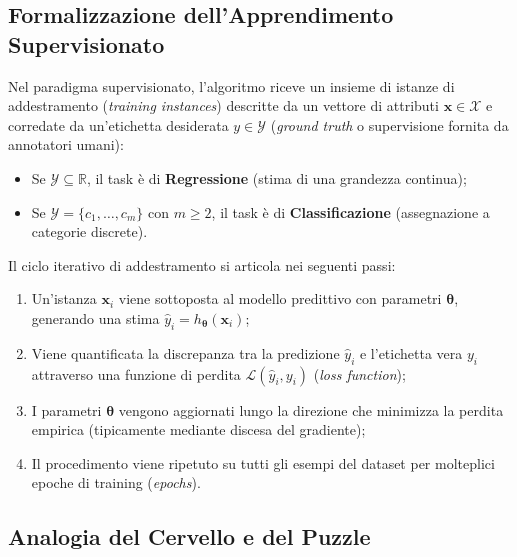 \FloatBarrier
\subsection{Formalizzazione dell'Apprendimento Supervisionato}
\label{subsec:formalizzazione-apprendimento-supervisionato}

Nel paradigma supervisionato, l'algoritmo riceve un insieme di istanze di addestramento (\textit{training instances}) descritte da un vettore di attributi $\mathbf{x} \in \mathcal{X}$ e corredate da un'etichetta desiderata $y \in \mathcal{Y}$ (\textit{ground truth} o supervisione fornita da annotatori umani):
\begin{itemize}
    \item Se $\mathcal{Y} \subseteq \mathbb{R}$, il task \`e di \textbf{Regressione} (stima di una grandezza continua);
    \item Se $\mathcal{Y} = \{c_1, \dots, c_m\}$ con $m \ge 2$, il task \`e di \textbf{Classificazione} (assegnazione a categorie discrete).
\end{itemize}

Il ciclo iterativo di addestramento si articola nei seguenti passi:
\begin{enumerate}
    \item Un'istanza $\mathbf{x}_i$ viene sottoposta al modello predittivo con parametri $\mathbf{\theta}$, generando una stima $\hat{y}_i = h_{\mathbf{\theta}}(\mathbf{x}_i)$;
    \item Viene quantificata la discrepanza tra la predizione $\hat{y}_i$ e l'etichetta vera $y_i$ attraverso una funzione di perdita $\mathcal{L}(\hat{y}_i, y_i)$ (\textit{loss function});
    \item I parametri $\mathbf{\theta}$ vengono aggiornati lungo la direzione che minimizza la perdita empirica (tipicamente mediante discesa del gradiente);
    \item Il procedimento viene ripetuto su tutti gli esempi del dataset per molteplici epoche di training (\textit{epochs}).
\end{enumerate}

\FloatBarrier
\subsection{Analogia del Cervello e del Puzzle}
\label{subsec:analogia-puzzle}


